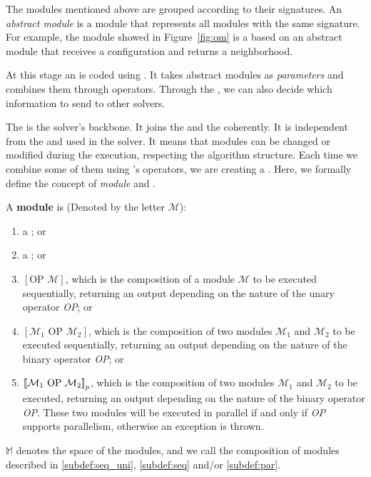 The modules mentioned above are grouped according to their signatures. An \textit{abstract module} is a module that represents all modules with the same signature. For example, the module showed in Figure~\ref{fig:om} is a \om{} based on an abstract module that receives a configuration and returns a neighborhood. %

At this stage an \INTROas{} is coded using \posl{}. It takes abstract modules as {\it parameters} and combines them through operators. Through the \as, we can also decide which information to send to other solvers. %

The \as{} is the solver's backbone. It joins the \oms{} and the \opchs{} coherently. It is independent from the \oms{} and \opchs{} used in the solver. It means that modules can be changed or modified during the execution, respecting the algorithm structure. Each time we combine some of them using \posl's operators, we are creating a \INTROcm. Here, we formally define the concept of \textit{module} and \INTROcm.

\begin{definition}
\label{def:module}
A {\bf module} is (Denoted by the letter $\mathcal{M}$):
\begin{enumerate}\renewcommand{\labelitemi}{\scriptsize$\blacksquare$}
\item a \om{}; or
\item a \opch{}; or
\item $\left[\text{OP } \mathcal{M}\right]$, which is the composition of a module $\mathcal{M}$ to be executed sequentially, returning an output depending on the nature of the unary operator \emph{OP}; or\label{subdef:seq_uni}
\item $\left[\mathcal{M}_1 \text{ OP } \mathcal{M}_2\right]$, which is the composition of two modules $\mathcal{M}_1$ and $\mathcal{M}_2$ to be executed sequentially, returning an output depending on the nature of the binary operator \emph{OP}; or\label{subdef:seq}
\item $\left\llbracket\mathcal{M}_1 \text{ OP } \mathcal{M}_2\right\rrbracket_p$, which is the composition of two modules $\mathcal{M}_1$ and $\mathcal{M}_2$ to be executed, returning an output depending on the nature of the binary operator \emph{OP}. These two modules will be executed in parallel if and only if \emph{OP} supports parallelism, %
otherwise an exception is thrown.\label{subdef:par}
\end{enumerate}
$\mathbb{M}$ denotes the space of the modules, and we call \cms{} the composition of modules described in \ref{subdef:seq_uni}, \ref{subdef:seq} and/or \ref{subdef:par}.
\end{definition}

